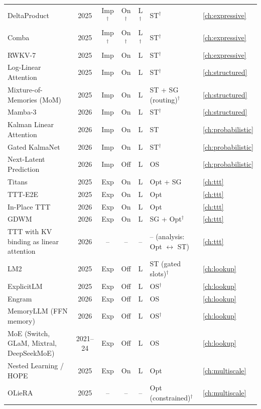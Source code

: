 \begin{longtable}{@{}>{\raggedright\arraybackslash}p{4.1cm}c c c c >{\raggedright\arraybackslash}p{4.2cm}l@{}}
\midrule
DeltaProduct & 2025 & Imp$^{\dagger}$ & On$^{\dagger}$ & L$^{\dagger}$ & ST$^{\dagger}$ & \cref{ch:expressive} \\
Comba & 2025 & Imp$^{\dagger}$ & On$^{\dagger}$ & L$^{\dagger}$ & ST$^{\dagger}$ & \cref{ch:expressive} \\
RWKV-7 & 2025 & Imp & On & L & ST$^{\dagger}$ & \cref{ch:expressive} \\
\midrule
Log-Linear Attention & 2025 & Imp & On & L & ST$^{\dagger}$ & \cref{ch:structured} \\
Mixture-of-Memories (MoM) & 2025 & Imp & On & L & ST + SG (routing)$^{\dagger}$ & \cref{ch:structured} \\
Mamba-3 & 2026 & Imp & On & L & ST$^{\dagger}$ & \cref{ch:structured} \\
\midrule
Kalman Linear Attention & 2026 & Imp & On & L & ST & \cref{ch:probabilistic} \\
Gated KalmaNet & 2026 & Imp & On & L & ST$^{\dagger}$ & \cref{ch:probabilistic} \\
Next-Latent Prediction & 2026 & Imp & Off & L & OS & \cref{ch:probabilistic} \\
\midrule
Titans & 2025 & Exp & On & L & Opt + SG & \cref{ch:ttt} \\
TTT-E2E & 2025 & Exp & On & L & Opt & \cref{ch:ttt} \\
In-Place TTT & 2026 & Exp & On & L & Opt & \cref{ch:ttt} \\
GDWM & 2026 & Exp & On & L & SG + Opt$^{\dagger}$ & \cref{ch:ttt} \\
TTT with KV binding as linear attention & 2026 & -- & -- & -- & -- (analysis: Opt $\leftrightarrow$ ST) & \cref{ch:ttt} \\
\midrule
LM2 & 2025 & Exp & Off & L & ST (gated slots)$^{\dagger}$ & \cref{ch:lookup} \\
ExplicitLM & 2025 & Exp & Off & L & OS$^{\dagger}$ & \cref{ch:lookup} \\
Engram & 2026 & Exp & Off & L & OS & \cref{ch:lookup} \\
MemoryLLM (FFN memory) & 2026 & Exp & Off & L & OS$^{\dagger}$ & \cref{ch:lookup} \\
MoE (Switch, GLaM, Mixtral, DeepSeekMoE) & 2021--24 & Exp & Off & L & OS & \cref{ch:lookup} \\
\midrule
Nested Learning / HOPE & 2025 & Exp & On & L & Opt & \cref{ch:multiscale} \\
OLieRA & 2025 & -- & -- & -- & Opt (constrained)$^{\dagger}$ & \cref{ch:multiscale} \\

\end{longtable}
